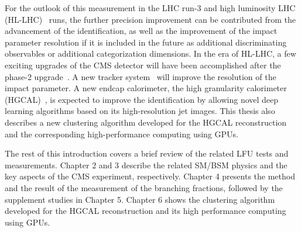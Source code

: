 For the outlook of this measurement in the LHC run-3 and high luminosity LHC (HL-LHC)~\cite{Apollinari:2284929} runs, the further precision improvement can be contributed from the advancement of the \PGth identification, as well as the improvement of the impact parameter resolution if it is included in the future as additional discriminating observables or additional categorization dimensions. In the era of HL-LHC, a few exciting upgrades of the CMS detector will have been accomplished after the phase-2 upgrade~\cite{CMSCollaboration:2015zni}. A new tracker system~\cite{Klein:2017nke} will improve the resolution of the impact parameter. A new endcap calorimeter, the high granularity calorimeter (HGCAL)~\cite{Collaboration:2293646}, is expected to improve the \PGth identification by allowing novel deep learning algorithms based on its high-resolution jet images. This thesis also describes a new clustering algorithm developed for the HGCAL reconstruction and the corresponding high-performance computing using GPUs.



The rest of this introduction covers a brief review of the related LFU tests and \absVcs measurements. Chapter 2 and 3 describe the related SM/BSM physics and the key aspects of the CMS experiment, respectively. Chapter 4 presents the method and the result of the measurement of the \PW branching fractions, followed by the supplement studies in Chapter 5. Chapter 6 shows the clustering algorithm developed for the HGCAL reconstruction and its high performance computing using GPUs.
